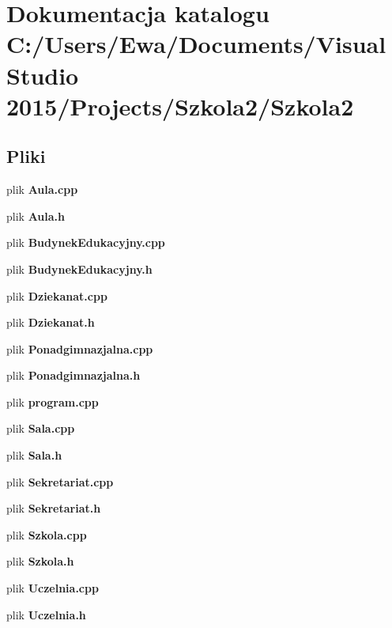 \section{Dokumentacja katalogu C\+:/\+Users/\+Ewa/\+Documents/\+Visual Studio 2015/\+Projects/\+Szkola2/\+Szkola2}
\label{dir_861c99cb96ca097a0ee290031bc54786}
\subsection*{Pliki}
\begin{DoxyCompactItemize}
\item 
plik \textbf{ Aula.\+cpp}
\item 
plik \textbf{ Aula.\+h}
\item 
plik \textbf{ Budynek\+Edukacyjny.\+cpp}
\item 
plik \textbf{ Budynek\+Edukacyjny.\+h}
\item 
plik \textbf{ Dziekanat.\+cpp}
\item 
plik \textbf{ Dziekanat.\+h}
\item 
plik \textbf{ Ponadgimnazjalna.\+cpp}
\item 
plik \textbf{ Ponadgimnazjalna.\+h}
\item 
plik \textbf{ program.\+cpp}
\item 
plik \textbf{ Sala.\+cpp}
\item 
plik \textbf{ Sala.\+h}
\item 
plik \textbf{ Sekretariat.\+cpp}
\item 
plik \textbf{ Sekretariat.\+h}
\item 
plik \textbf{ Szkola.\+cpp}
\item 
plik \textbf{ Szkola.\+h}
\item 
plik \textbf{ Uczelnia.\+cpp}
\item 
plik \textbf{ Uczelnia.\+h}
\end{DoxyCompactItemize}
